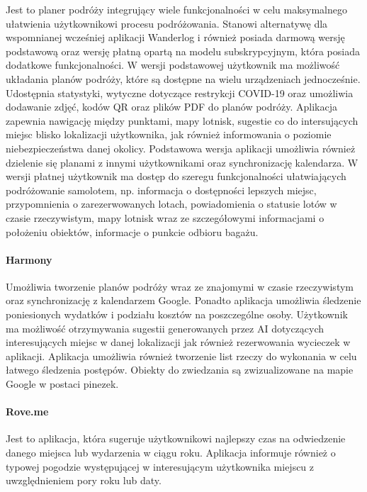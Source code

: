 Jest to planer podróży integrujący wiele funkcjonalności w celu maksymalnego ułatwienia użytkownikowi procesu podróżowania.
Stanowi alternatywę dla wspomnianej wcześniej aplikacji Wanderlog i również posiada darmową wersję podstawową oraz wersję płatną
opartą na modelu subskrypcyjnym, która posiada dodatkowe funkcjonalności. W wersji podstawowej użytkownik ma możliwość układania
planów podróży, które są dostępne na wielu urządzeniach jednocześnie. Udostępnia statystyki, wytyczne dotyczące restrykcji COVID-19
oraz umożliwia dodawanie zdjęć, kodów QR oraz plików PDF do planów podróży. Aplikacja zapewnia nawigację między punktami,
mapy lotnisk, sugestie co do intersujących miejsc blisko lokalizacji użytkownika,
jak również informowania o poziomie niebezpieczeństwa danej okolicy.
Podstawowa wersja aplikacji umożliwia również dzielenie się planami z innymi użytkownikami oraz synchronizację kalendarza.
W wersji płatnej użytkownik ma dostęp do szeregu funkcjonalności ułatwiających podróżowanie samolotem, np. informacja o dostępności
lepszych miejsc, przypomnienia o zarezerwowanych lotach, powiadomienia o statusie lotów w czasie rzeczywistym, mapy lotnisk wraz
ze szczegółowymi informacjami o położeniu obiektów, informacje o punkcie odbioru bagażu.

\paragraph{Harmony}

Umożliwia tworzenie planów podróży wraz ze znajomymi w czasie rzeczywistym oraz synchronizację z kalendarzem Google.
Ponadto aplikacja umożliwia śledzenie poniesionych wydatków i podziału kosztów na poszczególne osoby.
Użytkownik ma możliwość otrzymywania sugestii generowanych przez AI dotyczących interesujących miejsc w danej lokalizacji
jak również rezerwowania wycieczek w aplikacji. Aplikacja umożliwia również tworzenie list rzeczy do wykonania w
celu łatwego śledzenia postępów. Obiekty do zwiedzania są zwizualizowane na mapie Google w postaci pinezek.

\paragraph{Rove.me}

Jest to aplikacja, która sugeruje użytkownikowi najlepszy czas na odwiedzenie danego miejsca lub wydarzenia w ciągu roku.
Aplikacja informuje również o typowej pogodzie występującej w interesującym użytkownika miejscu z uwzględnieniem pory roku lub daty.

